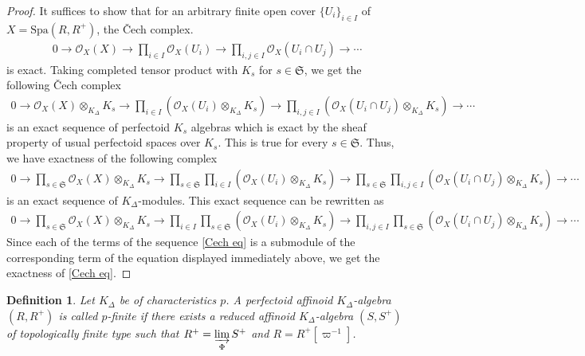 \documentclass[12pts,a4paper]{amsart}
\newtheorem{definition}[proposition]{Definition}
\begin{document}
\begin{proof}
     It suffices to show that for an arbitrary finite open cover $\{U_i\}_{i\in I}$ of $X=\mathrm{Spa}(R,R^+)$, the \v{C}ech complex.
\begin{align}\label{Cech eq}
0\to\mathcal{O}_X(X)\to \prod\limits_{i\in I}\mathcal{O}_X(U_i)\to \prod\limits_{i,j\in I}\mathcal{O}_X(U_i\cap U_j)\to\cdots
\end{align}
is exact. Taking completed tensor product with $K_s$ for $s\in\mathfrak{S}$, we get the following \v{C}ech complex
\begin{align*}
0\to\mathcal{O}_X(X)\otimes_{K_\Delta}K_s\to \prod\limits_{i\in I}(\mathcal{O}_X(U_i)\otimes_{K_\Delta} K_s)\to \prod\limits_{i,j\in I}(\mathcal{O}_X(U_i\cap U_j)\otimes_{K_\Delta} K_s)\to\cdots
\end{align*}
is an exact sequence of perfectoid $K_s$ algebras which is exact by the sheaf property of usual perfectoid spaces over $K_s$. This is true for every $s\in\mathfrak{S}$. Thus, we have exactness of the following complex
\begin{align*}
  0\to\prod\limits_{s\in\mathfrak{S}}\mathcal{O}_X(X)\otimes_{K_\Delta}K_s\to \prod\limits_{s\in\mathfrak{S}}\prod\limits_{i\in I}(\mathcal{O}_X(U_i)\otimes_{K_\Delta} K_s)\to \prod\limits_{s\in\mathfrak{S}}\prod\limits_{i,j\in I}(\mathcal{O}_X(U_i\cap U_j)\otimes_{K_\Delta} K_s)\to\cdots
\end{align*}
is an exact sequence of $K_\Delta$-modules. This exact sequence can be rewritten as 
\begin{align*}\label{s Cech eq}
  0\to\prod\limits_{s\in\mathfrak{S}}\mathcal{O}_X(X)\otimes_{K_\Delta}K_s\to \prod\limits_{i\in I}\prod\limits_{s\in\mathfrak{S}}(\mathcal{O}_X(U_i)\otimes_{K_\Delta} K_s)\to \prod\limits_{i,j\in I}\prod\limits_{s\in\mathfrak{S}}(\mathcal{O}_X(U_i\cap U_j)\otimes_{K_\Delta} K_s)\to\cdots
\end{align*}
Since each of the terms of the sequence \ref{Cech eq} is a submodule of the corresponding term of the equation displayed immediately above, we get the exactness of \ref{Cech eq}.
\end{proof}

\begin{definition}
    Let $K_\Delta$ be of characteristics $p$. A perfectoid affinoid $K_\Delta$-algebra $(R,R^+)$ is called \emph{$p$-finite} if there exists a reduced affinoid $K_\Delta$-algebra $(S,S^+)$ of topologically finite type such that $R^+=\varinjlim\limits_{\Phi}S^+$ and $R=R^+[\varpi^{-1}]$.
\end{definition}
\end{document}
